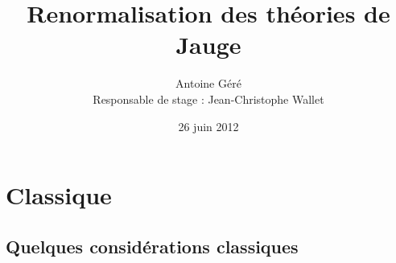 \documentclass{beamer}
\begin{document}
\title{\LARGE Renormalisation des théories de Jauge}  

\author{Antoine Géré \\ Responsable de stage : Jean-Christophe Wallet}

\date{26 juin 2012} 

\frame{\titlepage

} 


\section{Classique} 

\subsection{Quelques considérations classiques}
\end{document}
